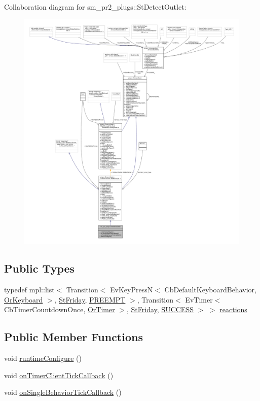 Collaboration diagram for sm\+\_\+pr2\+\_\+plugs\+:\+:St\+Detect\+Outlet\+:
\nopagebreak
\begin{figure}[H]
\begin{center}
\leavevmode
\includegraphics[width=350pt]{structsm__pr2__plugs_1_1StDetectOutlet__coll__graph}
\end{center}
\end{figure}
\subsection*{Public Types}
\begin{DoxyCompactItemize}
\item 
typedef mpl\+::list$<$ Transition$<$ Ev\+Key\+PressN$<$ Cb\+Default\+Keyboard\+Behavior, \hyperlink{classsm__pr2__plugs_1_1OrKeyboard}{Or\+Keyboard} $>$, \hyperlink{structsm__pr2__plugs_1_1StFriday}{St\+Friday}, \hyperlink{classPREEMPT}{P\+R\+E\+E\+M\+PT} $>$, Transition$<$ Ev\+Timer$<$ Cb\+Timer\+Countdown\+Once, \hyperlink{classsm__pr2__plugs_1_1OrTimer}{Or\+Timer} $>$, \hyperlink{structsm__pr2__plugs_1_1StFriday}{St\+Friday}, \hyperlink{classSUCCESS}{S\+U\+C\+C\+E\+SS} $>$ $>$ \hyperlink{structsm__pr2__plugs_1_1StDetectOutlet_ada5b434f5d792f4b09c90b7b56cfaa03}{reactions}
\end{DoxyCompactItemize}
\subsection*{Public Member Functions}
\begin{DoxyCompactItemize}
\item 
void \hyperlink{structsm__pr2__plugs_1_1StDetectOutlet_a9fbc44b452367aa843d37316eb6e64bc}{runtime\+Configure} ()
\item 
void \hyperlink{structsm__pr2__plugs_1_1StDetectOutlet_a7d94748f071c0ee4b8055018ec546978}{on\+Timer\+Client\+Tick\+Callback} ()
\item 
void \hyperlink{structsm__pr2__plugs_1_1StDetectOutlet_a866f3243790c115b886d447725fa602b}{on\+Single\+Behavior\+Tick\+Callback} ()
\end{DoxyCompactItemize}
